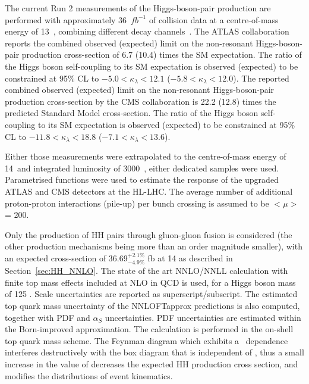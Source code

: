 \documentclass[../report.tex]{subfiles}
\begin{document}







\label{sec:HH_meas_exp}

The current Run 2 measurements of the Higgs-boson-pair production are performed with approximately 36~$fb^{-1}$ of collision data at a centre-of-mass energy of 13~\UTeV, combining different decay channels~\cite{ATLAS-CONF-2018-043, Sirunyan:2018two}. 
The ATLAS collaboration reports the combined observed (expected) limit on the non-resonant Higgs-boson-pair production cross-section of 6.7 (10.4) times the SM expectation. The ratio of the Higgs boson self-coupling to its SM expectation is observed (expected) to be constrained at 95\% CL to $-5.0<\kappa_{\lambda}<12.1$ ($-5.8<\kappa_{\lambda}<12.0$). 
The reported combined observed (expected) limit on the non-resonant Higgs-boson-pair production cross-section by the CMS collaboration is 22.2 (12.8) times the predicted Standard Model cross-section. The ratio of the Higgs boson self-coupling to its SM expectation is observed (expected) to be constrained at 95\% CL to $-11.8<\kappa_{\lambda}<18.8$ ($-7.1<\kappa_{\lambda}<13.6$). 

Either those measurements were extrapolated to the centre-of-mass energy of 14~\UTeV and integrated luminosity of 3000~\ifb, either dedicated samples were used. Parametrised functions were used to estimate the response of the upgraded ATLAS and CMS detectors at the HL-LHC. The average number of additional proton-proton interactions (pile-up) per bunch crossing is assumed to be $<\mu>$ = 200.

Only the production of HH pairs through gluon-gluon fusion is considered (the other production mechanisms being more than an order magnitude smaller), with an expected cross-section of 36.69$^{+2.1\%}_{-4.9\%}$ fb at 14 \UTeV as described in Section~\ref{sec:HH_NNLO}. The state of the art NNLO/NNLL calculation with finite top mass effects included at NLO in QCD is used, for a Higgs boson mass of 125 \UGeV. Scale uncertainties are reported as superscript/subscript. The estimated top quark mass uncertainty of the NNLOFTapprox predictions is also computed, together with PDF and $\alpha_{S}$ uncertainties. PDF uncertainties are estimated within the Born-improved approximation. The calculation is performed in the on-shell top quark mass scheme.
The Feynman diagram which exhibits a \lHHH\ dependence interferes destructively with the box diagram that is independent of \lHHH, thus a small increase in the value of \lHHH decreases the expected HH production cross section, and modifies the distributions of event kinematics.
\end{document}
